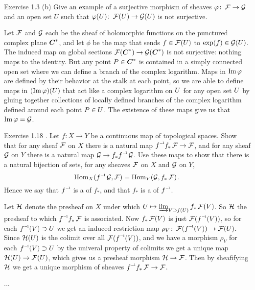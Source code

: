\begin{exercise}{Exercise 1.3 (b)}
    Give an example of a surjective morphism of sheaves 
    $\varphi \colon \operatorname{\mathcal{F}} \to \operatorname{\mathcal{G}}$ and an open set $U$ such that
    $\varphi(U) \colon \operatorname{\mathcal{F}}(U) \to \operatorname{\mathcal{G}}(U)$ is not surjective.
\end{exercise}
\begin{solution}
    Let $\operatorname{\mathcal{F}}$ and $\operatorname{\mathcal{G}}$ each be the sheaf of holomorphic functions 
    on the punctured complex plane $\boldsymbol{C}^\ast$,
    and let $\phi$ be the map that sends $f \in \operatorname{\mathcal{F}}(U)$
    to $\exp(f) \in \operatorname{\mathcal{G}}(U)$.
    The induced map on global sections
    $\operatorname{\mathcal{F}}(\boldsymbol{C}^\ast) \to \operatorname{\mathcal{G}}(\boldsymbol{C}^\ast)$ 
    is not surjective: nothing maps to the identity.
    But any point $P \in \boldsymbol{C}^\ast$ is contained in a simply connected 
    open set where we can define a branch of the complex logarithm.
    Maps in $\operatorname{Im} \varphi$ are defined 
    by their behavior at the stalk at each point,
    so we are able to define maps in $(\operatorname{Im} \varphi)(U)$
    that act like a complex logarithm on $U$ 
    for any open set $U$ by gluing together collections 
    of locally defined branches of the complex logarithm
    defined around each point $P \in U$.
    The existence of these maps give us that $\operatorname{Im} \varphi = \operatorname{\mathcal{G}}$.
\end{solution}

\begin{exercise}{Exercise 1.18}
    . 
    Let $f \colon X \to Y$ be a continuous map of topological spaces.
    Show that for any sheaf $\operatorname{\mathcal{F}}$ on $X$ 
    there is a natural map $\inv{f}f_\ast\FSheaf \to \FSheaf$,
    and for any sheaf $\operatorname{\mathcal{G}}$ on $Y$
    there is a natural map $\GSheaf \to f_\ast\inv{f}\GSheaf$.
    Use these maps to show that there is a natural bijection of sets,
    for any sheaves $\operatorname{\mathcal{F}}$ on $X$ and $\operatorname{\mathcal{G}}$ on $Y$,
    \begin{equation*}
        \Hom_X(\inv{f}\GSheaf,\FSheaf) = \Hom_Y(\GSheaf,f_\ast\FSheaf)\,.
    \end{equation*}
    Hence we say that $\inv{f}$ is a  of $f_\ast$,
    and that $f_\ast$ is a  of $\inv{f}$.
\end{exercise}
\begin{solution}
    Let $\operatorname{\mathcal{H}}$ denote the presheaf on $X$ under which
    $U \mapsto \varinjlim_{V \supset f(U)} f_\ast\operatorname{\mathcal{F}}(V)$.
    So $\operatorname{\mathcal{H}}$ the presheaf to which 
    $\inv{f}f_\ast\FSheaf$ is associated.
    Now $f_\ast\operatorname{\mathcal{F}}(V)$ is just $\FSheaf(\inv{f}(V))$,
    so for each $\inv{f}(V) \supset \open$ 
    we get an induced restriction map 
    $\rho_V \colon \FSheaf(\inv{f}(V)) \to \FSheaf(\open)$.
    Since $\operatorname{\mathcal{H}}(U)$ is the colimit over all $\FSheaf(\inv{f}(V))$,
    and we have a morphism $\rho_V$ for each $\inv{f}(V) \supset \open$
    by the univeral property of colimits we get a unique map
    $\operatorname{\mathcal{H}}(U) \to \operatorname{\mathcal{F}}(U)$,
    which gives us a presheaf morphism $\operatorname{\mathcal{H}} \to \operatorname{\mathcal{F}}$.
    Then by sheafifying $\operatorname{\mathcal{H}}$ we get a unique morphism of sheaves 
    $\inv{f}f_\ast\FSheaf \to \FSheaf$.

    ...
\end{solution}
